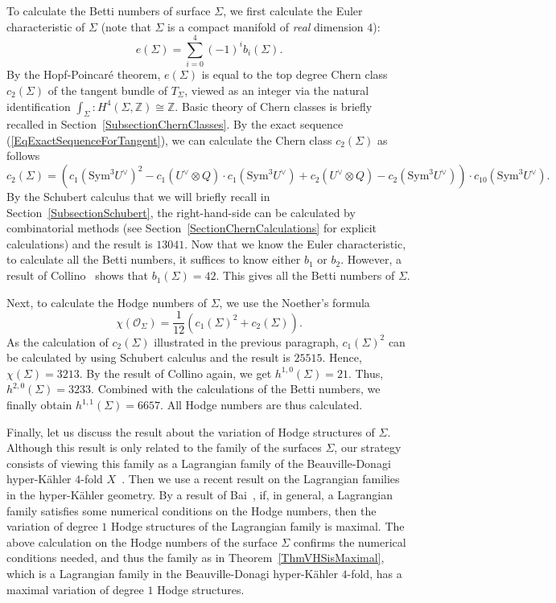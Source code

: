 \documentclass{article}
\theoremstyle{definition}
\begin{document}
To calculate the Betti numbers of surface $\Sigma$, we first calculate the Euler characteristic of $\Sigma$ (note that $\Sigma$ is a compact manifold of \emph{real} dimension $4$):
\[
e(\Sigma) = \sum_{i = 0}^4 (-1)^ib_i(\Sigma).
\]
By the Hopf-Poincaré theorem, $e(\Sigma)$ is equal to the top degree Chern class $c_2(\Sigma)$ of the tangent bundle of $T_\Sigma$, viewed as an integer via the natural identification $\int_\Sigma: H^4(\Sigma, \mathbb Z)\cong\mathbb Z$. Basic theory of Chern classes is briefly recalled in Section~\ref{SubsectionChernClasses}. By the exact sequence (\ref{EqExactSequenceForTangent}), we can calculate the Chern class $c_2(\Sigma)$ as follows
$$c_2(\Sigma) = \left( c_1(\mathrm{Sym}^3 U^\vee)^2 - c_1(U^\vee \otimes Q) \cdot c_1(\mathrm{Sym}^3 U^\vee) + c_2(U^\vee \otimes Q) - c_2(\mathrm{Sym}^3 U^\vee) \right) \cdot c_{10}(\mathrm{Sym}^3 U^\vee).$$
By the Schubert calculus that we will briefly recall in Section~\ref{SubsectionSchubert}, the right-hand-side can be calculated by combinatorial methods (see Section~\ref{SectionChernCalculations} for explicit calculations) and the result is $13041$. Now that we know the Euler characteristic, to calculate all the Betti numbers, it suffices to know either $b_1$ or $b_2$. However, a result of Collino~\cite{Collino} shows that $b_1(\Sigma) = 42$. This gives all the Betti numbers of $\Sigma$.

Next, to calculate the Hodge numbers of $\Sigma$, we use the Noether's formula
\[
\chi(\mathcal{O}_\Sigma) = \frac{1}{12}(c_1(\Sigma)^2 + c_2(\Sigma)).
\]
As the calculation of $c_2(\Sigma)$ illustrated in the previous paragraph, $c_1(\Sigma)^2$ can be calculated by using Schubert calculus and the result is $25515$. Hence, $\chi(\Sigma) = 3213$. By the result of Collino again, we get $h^{1,0}(\Sigma) = 21$. Thus, $h^{2, 0}(\Sigma) = 3233$. Combined with the calculations of the Betti numbers, we finally obtain $h^{1,1}(\Sigma) = 6657$. All Hodge numbers are thus calculated.

Finally, let us discuss the result about the variation of Hodge structures of $\Sigma$. Although this result is only related to the family of the surfaces $\Sigma$, our strategy consists of viewing this family as a Lagrangian family of the Beauville-Donagi hyper-Kähler $4$-fold $X$~\cite{IlievManivel, BD}. Then we use a recent result on the Lagrangian families in the hyper-Kähler geometry. By a result of Bai~\cite[Proposition 2]{Bai}, if, in general, a Lagrangian family satisfies some numerical conditions on the Hodge numbers, then the variation of degree $1$ Hodge structures of the Lagrangian family is maximal. The above calculation on the Hodge numbers of the surface $\Sigma$ confirms the numerical conditions needed, and thus the family as in Theorem~\ref{ThmVHSisMaximal}, which is a Lagrangian family in the Beauville-Donagi hyper-Kähler $4$-fold, has a maximal variation of degree $1$ Hodge structures.
\end{document}
